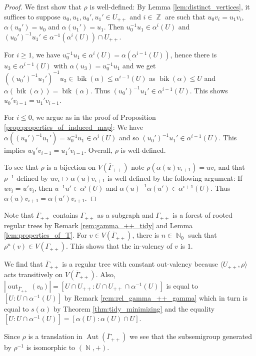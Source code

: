 \documentclass{article}
\DeclareMathOperator\Aut{Aut}
\DeclareMathOperator\bik{bik}
\DeclareMathOperator\out{out}
\DeclareMathOperator\bbN{\mathbb{N}}
\DeclareMathOperator\bbZ{\mathbb{Z}}
\theoremstyle{definition}
\begin{document}
\begin{proof}
We first show that $\rho$ is well-defined: By Lemma \ref{lem:distinct_vertices}, it suffices to suppose $u_0,u_1,u_0',u_1'\in U_{++}$ and $i\in\bbZ$ are such that $u_0v_{i} \!=\! u_1v_{i}$, $\alpha(u_0') \!=\! u_0$ and $\alpha(u_1') \!=\! u_1$. Then $u_0^{-1}u_1\in \alpha^{i}(U)$ and $(u_0')^{-1}u_1'\in \alpha^{-1}(\alpha^{i}(U))\cap U_{++}$.

For $i\ge 1$, we have $u_{0}^{-1}u_{1}\in\alpha^{i}(U)=\alpha(\alpha^{i-1}(U))$, hence there is $u_3\in \alpha^{i-1}(U)$ with $\alpha(u_3) = u_0^{-1}u_1$ and we get $((u_0')^{-1}u_1')^{-1}u_3\in \bik(\alpha)\le \alpha^{i-1}(U)$ as $\bik(\alpha)\le U$ and $\alpha(\bik(\alpha))=\bik(\alpha)$. Thus $(u_0')^{-1}u_1'\in \alpha^{i-1}(U)$. This shows $u_0'v_{i - 1} = u_1'v_{i - 1}$.

For $i\le 0$, we argue as in the proof of Proposition \ref{prop:properties_of_induced_map}: We have $\alpha((u_0')^{-1}u_{1}') = u_{0}^{-1}u_1\in \alpha^{i}(U)$ and so $(u_0')^{-1}u_1'\in \alpha^{i-1}(U)$. This implies $w_0'v_{i-1} = u_{1}'v_{i-1}$. Overall, $\rho$ is well-defined.

To see that $\rho$ is a bijection on $V(\overline{\Gamma}_{++})$ note $\rho(\alpha(u)v_{i+1}) = uv_i$ and that $\rho^{-1}$ defined by $uv_{i}\mapsto \alpha(u)v_{i+1}$ is well-defined by the following argument: If $uv_{i} =u'v_{i}$, then $u^{-1}u'\in \alpha^{i}(U)$ and $\alpha(u)^{-1}\alpha(u')\in \alpha^{i+1}(U)$. Thus $\alpha(u)v_{i+1} = \alpha(u')v_{i+1}$.
\end{proof}

Note that $\overline{\Gamma}_{++}$ contains $\Gamma_{++}$ as a subgraph and $\Gamma_{++}$ is a forest of rooted regular trees by Remark \ref{rem:gamma_++_tidy} and Lemma \ref{lem:properties_of_T}. For $v\in V(\overline{\Gamma}_{++})$, there is $n\in\bbN_{0}$ such that $\rho^{n}(v)\in V(\Gamma_{++})$. This shows that the in-valency of $v$ is $1$. 

We find that $\overline{\Gamma}_{++}$ is a regular tree with constant out-valency because $\langle U_{++},\rho\rangle$ acts transitively on $V(\overline{\Gamma}_{++})$. Also, $|\out_{\overline{\Gamma}_{++}}(v_{0})|=[U\cap U_{++}:U\cap U_{++}\cap\alpha^{-1}(U)]$ is equal to $[U:U\cap\alpha^{-1}(U)]$ by Remark \ref{rem:rel_gamma_++_gamma} which in turn is equal to $s(\alpha)$ by Theorem \ref{thm:tidy_minimizing} and the equality $[U:U\cap\alpha^{-1}(U)]=[\alpha(U):\alpha(U)\cap U]$.

Since $\rho$ is a translation in $\Aut(\overline{\Gamma}_{++})$ we see that the subsemigroup generated by $\rho^{-1}$ is isomorphic to $(\bbN,+)$.
\end{document}
